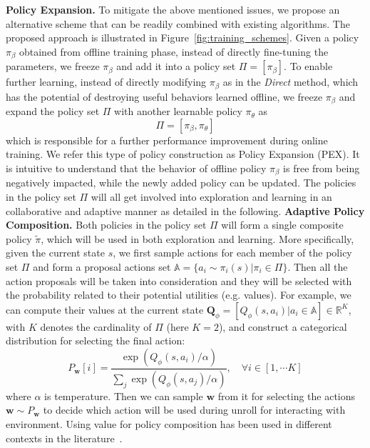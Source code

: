 \documentclass{article}
\newcommand{\w}{{\mathbf{w}}}
\begin{document}
{\flushleft \textbf{Policy Expansion.}} To mitigate the above mentioned issues, we propose an alternative scheme that can be readily combined with existing algorithms. The proposed approach is illustrated in Figure~\ref{fig:training_schemes}.
Given a policy $\pi_{\beta}$ obtained from offline training phase, instead of
directly fine-tuning the parameters,
we freeze  $\pi_{\beta}$ and add it into a policy set $\Pi=[\pi_{\beta}]$.
To enable further learning, instead of directly modifying $\pi_{\beta}$ as in the \emph{Direct} method, which has
the potential of destroying useful behaviors learned offline,
we freeze $\pi_{\beta}$ and expand the policy set $\Pi$ with another learnable policy $\pi_{\theta}$ as
\begin{equation}\label{eq:expand}
	\Pi=[\pi_{\beta}, \pi_{\theta}]
\end{equation}
which is  responsible for a further performance improvement during online training.
We refer this type of policy construction as Policy Expansion (PEX).
It is intuitive to understand that the behavior of offline policy $\pi_{\beta}$ is free from being
negatively impacted, while the newly added policy can be updated.
The policies in the policy set $\Pi$ will all get involved into exploration and learning
in an collaborative and adaptive manner as detailed in the following.
\vspace{-0.1in}
{\flushleft \textbf{Adaptive Policy Composition.}}  Both policies in the policy set $\Pi$ will form a single composite policy $\tilde{\pi}$, which will
be used in both exploration and learning.
More specifically, given the current state $s$,
we first sample actions for each member of the policy set $\Pi$ and form a proposal
actions set $\mathbb{A} = \{a_i \!\sim\! \pi_i(s)|\pi_i \in \Pi\}$.
Then all the action proposals will be taken into consideration and they will be selected
with the probability related to their potential utilities ({e.g.} values).
For example, we can compute their values at the current state $\mathbf{Q}_{\phi} \!\!=\!\! [Q_{\phi}(s, a_i)| a_i \in \mathbb{A}]\in \mathbb{R}^{K}$, with $K$ denotes the cardinality of $\Pi$ (here $K\!=\!2$), and   construct a categorical distribution for selecting the final action:
\begin{equation}\label{eq:w_net}
	P_{\w}[i] = \frac{\exp (Q_{\phi}(s, a_i)/\alpha)}{\sum_j \exp (Q_{\phi}(s, a_j)/\alpha)}, \quad \forall i \in [1, \cdots K]
\end{equation}where $\alpha$ is temperature.
Then we can sample $\w$ from it  for selecting the actions $\w \sim P_{\w}$ to decide which
action will be used during unroll for interacting with environment.
Using value for policy composition has been used in different contexts in the literature~\citep{taac, VFS}.
\end{document}
